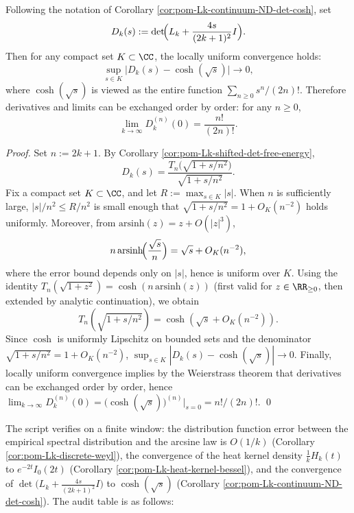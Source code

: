\begin{corollary}\label{cor:pom-Lk-continuum-ND-det-cosh-locally-uniform}
Following the notation of Corollary \ref{cor:pom-Lk-continuum-ND-det-cosh}, set
\[
D_k(s):=\det\!\Bigl(L_k+\frac{4s}{(2k+1)^2}I\Bigr).
\]
Then for any compact set \(K\subset\CC\), the locally uniform convergence holds:
\[
\sup_{s\in K}\bigl|D_k(s)-\cosh(\sqrt{s})\bigr|\longrightarrow 0,
\]
where \(\cosh(\sqrt{s})\) is viewed as the entire function
\(
\sum_{n\ge 0}s^n/(2n)!
\).
Therefore derivatives and limits can be exchanged order by order: for any \(n\ge 0\),
\[
\lim_{k\to\infty}D_k^{(n)}(0)=\frac{n!}{(2n)!}.
\]
\end{corollary}
\begin{proof}
Set \(n:=2k+1\). By Corollary \ref{cor:pom-Lk-shifted-det-free-energy},
\[
D_k(s)=\frac{T_{n}\!\bigl(\sqrt{1+s/n^2}\bigr)}{\sqrt{1+s/n^2}}.
\]
Fix a compact set \(K\subset\CC\), and let \(R:=\max_{s\in K}|s|\).
When \(n\) is sufficiently large, \(|s|/n^2\le R/n^2\) is small enough that
\(\sqrt{1+s/n^2}=1+O_K(n^{-2})\) holds uniformly.
Moreover, from \(\mathrm{arsinh}(z)=z+O(|z|^3)\),
\[
n\,\mathrm{arsinh}\!\Bigl(\frac{\sqrt{s}}{n}\Bigr)=\sqrt{s}+O_K(n^{-2}),
\]
where the error bound depends only on \(|s|\), hence is uniform over \(K\).
Using the identity \(T_n(\sqrt{1+z^2})=\cosh(n\,\mathrm{arsinh}(z))\) (first valid for \(z\in\RR_{\ge 0}\), then extended by analytic continuation), we obtain
\[
T_n(\sqrt{1+s/n^2})=\cosh(\sqrt{s}+O_K(n^{-2})).
\]
Since \(\cosh\) is uniformly Lipschitz on bounded sets and the denominator \(\sqrt{1+s/n^2}=1+O_K(n^{-2})\),
\(
\sup_{s\in K}|D_k(s)-\cosh(\sqrt{s})|\to 0
\).
Finally, locally uniform convergence implies by the Weierstrass theorem that derivatives can be exchanged order by order, hence
\(
\lim_{k\to\infty}D_k^{(n)}(0)=\bigl(\cosh(\sqrt{s})\bigr)^{(n)}|_{s=0}=n!/(2n)!
\).
\qed
\end{proof}

\begin{remark}\label{rem:pom-fence-green-kernel-spectral-limit-laws-audit}
The script verifies on a finite window: the distribution function error between the empirical spectral distribution and the arcsine law is \(O(1/k)\) (Corollary \ref{cor:pom-Lk-discrete-weyl}),
the convergence of the heat kernel density \(\frac{1}{k}H_k(t)\) to \(e^{-2t}I_0(2t)\) (Corollary \ref{cor:pom-Lk-heat-kernel-bessel}), and
the convergence of \(\det\bigl(L_k+\frac{4s}{(2k+1)^2}I\bigr)\) to \(\cosh(\sqrt{s})\) (Corollary \ref{cor:pom-Lk-continuum-ND-det-cosh}).
The audit table is as follows:

\end{remark}

